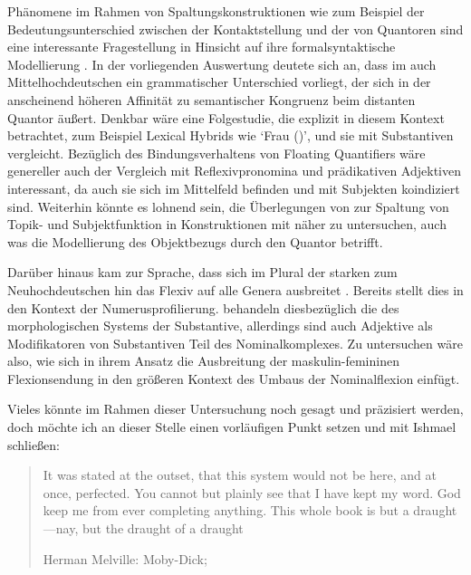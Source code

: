Phänomene im Rahmen von Spaltungskonstruktionen wie zum Beispiel der
Bedeutungs\-unterschied zwischen der Kontaktstellung und der
 von Quantoren sind eine interessante Fragestellung in
Hinsicht auf ihre formal\-syntaktische Modellierung \autocite[siehe
z.\,B.][]{pittner1995,merchant1996,fanselowcavar2002,nolda2007,shen2019}. In
der vorliegenden Auswertung deutete sich an, dass im auch
Mittelhochdeutschen ein grammatischer Unterschied
vorliegt, der sich in der anscheinend höheren Affinität zu semantischer
Kongruenz beim distanten Quantor äußert. Denkbar wäre eine Folgestudie, die
explizit   in diesem Kontext
betrachtet, zum Beispiel Lexical Hybrids wie  `Frau (\NeutF)', und
sie mit  Substantiven vergleicht. Bezüglich des
Bindungsverhaltens von Floating Quantifiers
wäre genereller auch der Vergleich mit Reflexivpronomina und prädikativen
Adjektiven interessant, da auch sie sich im Mittelfeld
befinden und mit Subjekten koindiziert sind. Weiterhin könnte es lohnend sein,
die Überlegungen von \citet{spector2009} zur Spaltung von Topik- und
Subjektfunktion in Konstruktionen mit  näher zu
untersuchen, auch was die Modellierung des Objektbezugs durch den Quantor
betrifft.

Darüber hinaus kam zur Sprache, dass sich im Plural der starken
 zum Neuhochdeutschen hin das
Flexiv  auf alle Genera ausbreitet
\autocite[vgl.][191--192]{reichmannwegera1993}. Bereits \citet{askedal1973}
stellt dies in den Kontext der Numerusprofilierung. \citet{dammelgillmann2014}
behandeln diesbezüglich die  des morphologischen Systems der
Substantive, allerdings sind auch Adjektive als
Modifikatoren von Substantiven Teil des Nominalkomplexes. Zu untersuchen wäre
also, wie sich in ihrem Ansatz die Ausbreitung der maskulin-femininen
Flexionsendung in den größeren Kontext des Umbaus der Nominal\-flexion einfügt.


Vieles könnte im Rahmen dieser Untersuchung noch gesagt und präzisiert werden,
doch möchte ich an dieser Stelle einen vorläufigen Punkt setzen und mit Ishmael
schließen: \foreignblockquote{english}[{Herman Melville: Moby-Dick;
\cite[159]{melville:mobydick}}]{It was stated at the outset, that this system
would not be here, and at once, perfected. You cannot but plainly see that I
have kept my word.
\textelp{}
God keep me from ever completing anything. This whole book is but a
draught---nay, but the draught of a draught}. %
